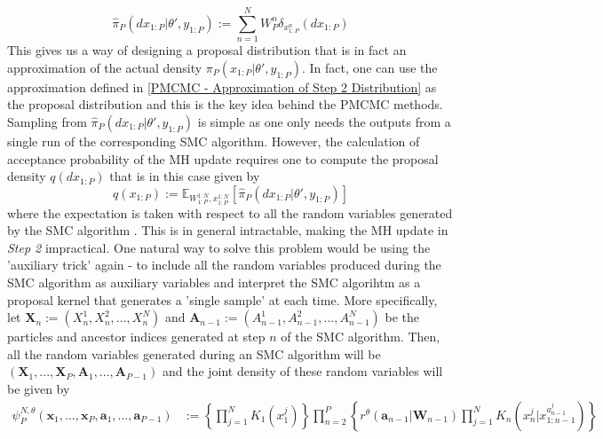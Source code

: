 \documentclass[12pt,a4paper]{article}
\begin{document}
\begin{equation}
    \label{PMCMC - Approximation of Step 2 Distribution}
    \hat{\pi}_P(dx_{1:P}|\theta',y_{1:P}):=\sum_{n=1}^{N} W_P^n \delta_{x_{1:P}^n}(dx_{1:P})
\end{equation}
This gives us a way of designing a proposal distribution that is in fact an approximation of the actual density $\pi_P(x_{1:P}|\theta',y_{1:P})$. In fact, one can use the approximation defined in \eqref{PMCMC - Approximation of Step 2 Distribution} as the proposal distribution and this is the key idea behind the PMCMC methods. Sampling from $\hat{\pi}_P(dx_{1:P}|\theta',y_{1:P})$ is simple as one only needs the outputs from a single run of the corresponding SMC algorithm. However, the calculation of acceptance probability of the MH update requires one to compute the proposal density $q(dx_{1:P})$ that is in this case given by 
\begin{equation}
    q(x_{1:P}) := \mathbb{E}_{W_{1:P}^{1:N},x_{1:P}^{1:N}}\left[\hat{\pi}_P(dx_{1:P}|\theta',y_{1:P})\right]
\end{equation}
where the expectation is taken with respect to all the random variables generated by the SMC algorithm \citep{andrieu2010particle}. This is in general intractable, making the MH update in \textit{Step 2} impractical. One natural way to solve this problem would be using the 'auxiliary trick' again - to include all the random variables produced during the SMC algorithm as auxiliary variables and interpret the SMC algorihtm as a proposal kernel that generates a 'single sample' at each time. More specifically, let $\mathbf{X}_n := \left(X_n^1,X_n^2,...,X_n^N\right)$ and $\mathbf{A}_{n-1}:=\left(A_{n-1}^1,A_{n-1}^2,...,A_{n-1}^N\right)$ be the particles and ancestor indices generated at step $n$ of the SMC algorithm. Then, all the random variables generated during an SMC algorithm will be $\left(\mathbf{X}_1,...,\mathbf{X}_P,\mathbf{A}_1,...,\mathbf{A}_{P-1}\right)$ and the joint density of these random variables will be given by 
\begin{equation}
    \label{JointDensity-of-SMC}
    \begin{split}
        \psi_P^{N,\theta}(\textbf{x}_1,...,\textbf{x}_P,\textbf{a}_1,...,\textbf{a}_{P-1}) & := \left\{\prod_{j=1}^{N}K_1\left(x_1^j\right)\right\}\prod_{n=2}^{P}\left\{r^{\theta}\left(\textbf{a}_{n-1}|\textbf{W}_{n-1}\right)\prod_{j=1}^{N}K_n\left(x_n^j|x_{1:n-1}^{a_{n-1}^j}\right)\right\}
    \end{split}
\end{equation}
\end{document}
